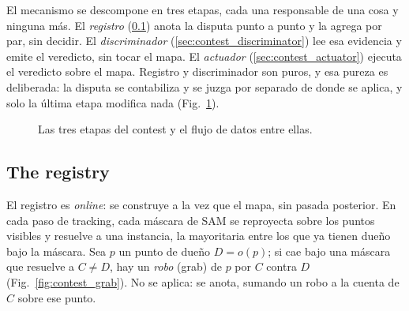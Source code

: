 El mecanismo se descompone en tres etapas, cada una responsable de una cosa y ninguna más.
El \emph{registro} (\ref{sec:contest_registry}) anota la disputa punto a punto y la agrega
por par, sin decidir. El \emph{discriminador} (\ref{sec:contest_discriminator}) lee esa
evidencia y emite el veredicto, sin tocar el mapa. El \emph{actuador}
(\ref{sec:contest_actuator}) ejecuta el veredicto sobre el mapa. Registro y discriminador
son puros, y esa pureza es deliberada: la disputa se contabiliza y se juzga por separado de
donde se aplica, y solo la última etapa modifica nada (Fig.~\ref{fig:contest_pipeline}).

\begin{figure}[ht]
  \centering
  \caption{Las tres etapas del contest y el flujo de datos entre ellas.}
  \label{fig:contest_pipeline}
\end{figure}

\subsection{The registry}
\label{sec:contest_registry}

El registro es \emph{online}: se construye a la vez que el mapa, sin pasada posterior. En
cada paso de \foreignlanguage{english}{tracking}, cada máscara de SAM se reproyecta sobre los
puntos visibles y resuelve a una instancia, la mayoritaria entre los que ya tienen dueño bajo
la máscara. Sea $p$ un punto de dueño $D = o(p)$; si cae bajo una máscara que resuelve a
$C \neq D$, hay un \emph{robo} (\foreignlanguage{english}{grab}) de $p$ por $C$ contra $D$
(Fig.~\ref{fig:contest_grab}). No se aplica: se anota, sumando un robo a la cuenta de $C$
sobre ese punto.


